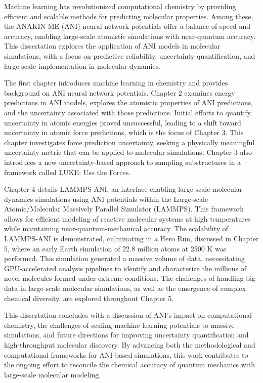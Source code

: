 Machine learning has revolutionized computational chemistry by providing efficient and scalable methods for predicting molecular properties. 
Among these, the ANAKIN-ME (ANI) neural network potentials offer a balance of speed and accuracy, enabling large-scale atomistic simulations with near-quantum accuracy. 
This dissertation explores the application of ANI models in molecular simulations, with a focus on predictive reliability, uncertainty quantification, and large-scale implementation in molecular dynamics.

The first chapter introduces machine learning in chemistry and provides background on ANI neural network potentials. 
Chapter 2 examines energy predictions in ANI models, explores the atomistic properties of ANI predictions, and the uncertainty associated with those predictions.
Initial efforts to quantify uncertainty in atomic energies proved unsuccessful, leading to a shift toward uncertainty in atomic force predictions, which is the focus of Chapter 3. 
This chapter investigates force prediction uncertainty, seeking a physically meaningful uncertainty metric that can be applied to molecular simulations.
Chapter 3 also introduces a new uncertainty-based approach to sampling substructures in a framework called LUKE: Use the Forces.

Chapter 4 details LAMMPS-ANI, an interface enabling large-scale molecular dynamics simulations using ANI potentials within the Large-scale Atomic/Molecular Massively Parallel Simulator (LAMMPS). 
This framework allows for efficient modeling of reactive molecular systems at high temperatures while maintaining near-quantum-mechanical accuracy.
The scalability of LAMMPS-ANI is demonstrated, culminating in a Hero Run, discussed in Chapter 5, where an early Earth simulation of 22.8 million atoms at 2500 K was performed. 
This simulation generated a massive volume of data, necessitating GPU-accelerated analysis pipelines to identify and characterize the millions of novel molecules formed under extreme conditions. 
The challenges of handling big data in large-scale molecular simulations, as well as the emergence of complex chemical diversity, are explored throughout Chapter 5.

This dissertation concludes with a discussion of ANI's impact on computational chemistry, the challenges of scaling machine learning potentials to massive simulations, and future directions for improving uncertainty quantification and high-throughput molecular discovery. 
By advancing both the methodological and computational frameworks for ANI-based simulations, this work contributes to the ongoing effort to reconcile the chemical accuracy of quantum mechanics with large-scale molecular modeling.